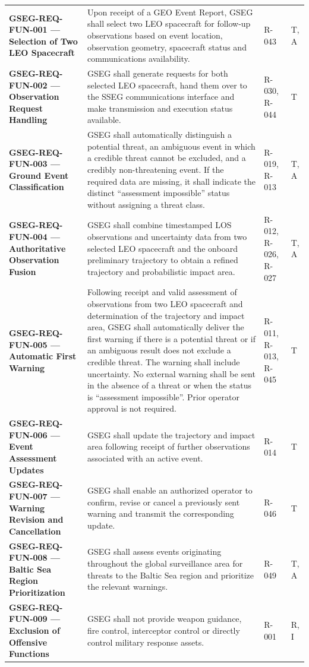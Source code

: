 \begin{longtable}{|P{0.27}|P{0.46}|P{0.16}|P{0.11}|}
\hline{}
 &  &  & \\ \hline
\endhead
\hline\endlastfoot
\textbf{GSEG-REQ-FUN-001 — Selection of Two LEO Spacecraft} & Upon receipt of a GEO Event Report, GSEG shall select two LEO spacecraft for follow-up observations based on event location, observation geometry, spacecraft status and communications availability. & R-043 & T, A\\ \hline
\textbf{GSEG-REQ-FUN-002 — Observation Request Handling} & GSEG shall generate requests for both selected LEO spacecraft, hand them over to the SSEG communications interface and make transmission and execution status available. & R-030, R-044 & T\\ \hline
\textbf{GSEG-REQ-FUN-003 — Ground Event Classification} & GSEG shall automatically distinguish a potential threat, an ambiguous event in which a credible threat cannot be excluded, and a credibly non-threatening event. If the required data are missing, it shall indicate the distinct “assessment impossible” status without assigning a threat class. & R-019, R-013 & T, A\\ \hline
\textbf{GSEG-REQ-FUN-004 — Authoritative Observation Fusion} & GSEG shall combine timestamped LOS observations and uncertainty data from two selected LEO spacecraft and the onboard preliminary trajectory to obtain a refined trajectory and probabilistic impact area. & R-012, R-026, R-027 & T, A\\ \hline
\textbf{GSEG-REQ-FUN-005 — Automatic First Warning} & Following receipt and valid assessment of observations from two LEO spacecraft and determination of the trajectory and impact area, GSEG shall automatically deliver the first warning if there is a potential threat or if an ambiguous result does not exclude a credible threat. The warning shall include uncertainty. No external warning shall be sent in the absence of a threat or when the status is “assessment impossible”. Prior operator approval is not required. & R-011, R-013, R-045 & T\\ \hline
\textbf{GSEG-REQ-FUN-006 — Event Assessment Updates} & GSEG shall update the trajectory and impact area following receipt of further observations associated with an active event. & R-014 & T\\ \hline
\textbf{GSEG-REQ-FUN-007 — Warning Revision and Cancellation} & GSEG shall enable an authorized operator to confirm, revise or cancel a previously sent warning and transmit the corresponding update. & R-046 & T\\ \hline
\textbf{GSEG-REQ-FUN-008 — Baltic Sea Region Prioritization} & GSEG shall assess events originating throughout the global surveillance area for threats to the Baltic Sea region and prioritize the relevant warnings. & R-049 & T, A\\ \hline
\textbf{GSEG-REQ-FUN-009 — Exclusion of Offensive Functions} & GSEG shall not provide weapon guidance, fire control, interceptor control or directly control military response assets. & R-001 & R, I\\*
\end{longtable}
